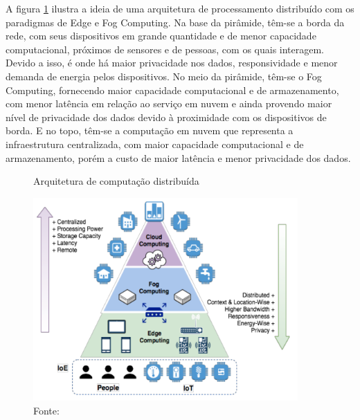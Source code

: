 A figura \ref{fig:arquitetura} ilustra a ideia de uma arquitetura de processamento distribuído com os paradigmas de Edge e Fog Computing. Na base da pirâmide, têm-se a borda da rede, com seus dispositivos em grande quantidade e de menor capacidade computacional, próximos de sensores e de pessoas, com os quais interagem. Devido a isso, é onde há maior privacidade nos dados, responsividade e menor demanda de energia pelos dispositivos. No meio da pirâmide, têm-se o Fog Computing, fornecendo maior capacidade computacional e de armazenamento, com menor latência em relação ao serviço em nuvem e ainda provendo maior nível de privacidade dos dados devido à proximidade com os dispositivos de borda. E no topo, têm-se a computação em nuvem que representa a infraestrutura centralizada, com maior capacidade computacional e de armazenamento, porém a custo de maior latência e menor privacidade dos dados.

\begin{figure}[H]
    \centering
    \caption[Arquitetura de computação distribuída]{Arquitetura de computação distribuída}
    \includegraphics[width=0.9\textwidth]{Cap2_Revisao_Teorica/Figures/arquitetura_distribuida.png}
    \caption*{Fonte: \cite{Pacheco2018}}
    \label{fig:arquitetura}
\end{figure}

